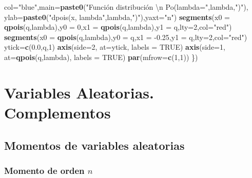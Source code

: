 \documentclass[]{book}
\newenvironment{Shaded}{\begin{snugshade}}{\end{snugshade}}
\newcommand{\CharTok}[1]{\textcolor[rgb]{0.31,0.60,0.02}{#1}}
\newcommand{\DataTypeTok}[1]{\textcolor[rgb]{0.13,0.29,0.53}{#1}}
\newcommand{\DecValTok}[1]{\textcolor[rgb]{0.00,0.00,0.81}{#1}}
\newcommand{\FloatTok}[1]{\textcolor[rgb]{0.00,0.00,0.81}{#1}}
\newcommand{\KeywordTok}[1]{\textcolor[rgb]{0.13,0.29,0.53}{\textbf{#1}}}
\newcommand{\NormalTok}[1]{#1}
\newcommand{\OtherTok}[1]{\textcolor[rgb]{0.56,0.35,0.01}{#1}}
\newcommand{\StringTok}[1]{\textcolor[rgb]{0.31,0.60,0.02}{#1}}
\begin{document}
\begin{Shaded}
\begin{Highlighting}[]
        \DataTypeTok{col=}\StringTok{"blue"}\NormalTok{,}\DataTypeTok{main=}\KeywordTok{paste0}\NormalTok{(}\StringTok{"Función distribución }\CharTok{\textbackslash{}n}\StringTok{ Po(lambda="}\NormalTok{,lambda,}\StringTok{")"}\NormalTok{),}
        \DataTypeTok{ylab=}\KeywordTok{paste0}\NormalTok{(}\StringTok{"dpois(x, lambda"}\NormalTok{,lambda,}\StringTok{")"}\NormalTok{),}\DataTypeTok{yaxt=}\StringTok{"n"}\NormalTok{)}
  \KeywordTok{segments}\NormalTok{(}\DataTypeTok{x0 =} \KeywordTok{qpois}\NormalTok{(q,lambda),}\DataTypeTok{y0 =} \DecValTok{0}\NormalTok{,}\DataTypeTok{x1 =} \KeywordTok{qpois}\NormalTok{(q,lambda),}\DataTypeTok{y1 =}\NormalTok{ q,}\DataTypeTok{lty=}\DecValTok{2}\NormalTok{,}\DataTypeTok{col=}\StringTok{"red"}\NormalTok{)}
  \KeywordTok{segments}\NormalTok{(}\DataTypeTok{x0 =} \KeywordTok{qpois}\NormalTok{(q,lambda),}\DataTypeTok{y0 =}\NormalTok{ q,}\DataTypeTok{x1 =} \FloatTok{-0.25}\NormalTok{,}\DataTypeTok{y1 =}\NormalTok{ q,}\DataTypeTok{lty=}\DecValTok{2}\NormalTok{,}\DataTypeTok{col=}\StringTok{"red"}\NormalTok{)}
\NormalTok{  ytick=}\KeywordTok{c}\NormalTok{(}\FloatTok{0.0}\NormalTok{,q,}\DecValTok{1}\NormalTok{)}
  \KeywordTok{axis}\NormalTok{(}\DataTypeTok{side=}\DecValTok{2}\NormalTok{, }\DataTypeTok{at=}\NormalTok{ytick, }\DataTypeTok{labels =} \OtherTok{TRUE}\NormalTok{)}
  \KeywordTok{axis}\NormalTok{(}\DataTypeTok{side=}\DecValTok{1}\NormalTok{, }\DataTypeTok{at=}\KeywordTok{qpois}\NormalTok{(q,lambda), }\DataTypeTok{labels =} \OtherTok{TRUE}\NormalTok{)}
  \KeywordTok{par}\NormalTok{(}\DataTypeTok{mfrow=}\KeywordTok{c}\NormalTok{(}\DecValTok{1}\NormalTok{,}\DecValTok{1}\NormalTok{))}
\NormalTok{\})}
\end{Highlighting}
\end{Shaded}

\hypertarget{variables-aleatorias.-complementos}{%
\chapter{Variables Aleatorias. Complementos}\label{variables-aleatorias.-complementos}}

\hypertarget{momentos-de-variables-aleatorias}{%
\section{Momentos de variables aleatorias}\label{momentos-de-variables-aleatorias}}

\hypertarget{momento-de-orden-n}{%
\subsection{\texorpdfstring{Momento de orden \(n\)}{Momento de orden n}}\label{momento-de-orden-n}}
\end{document}
